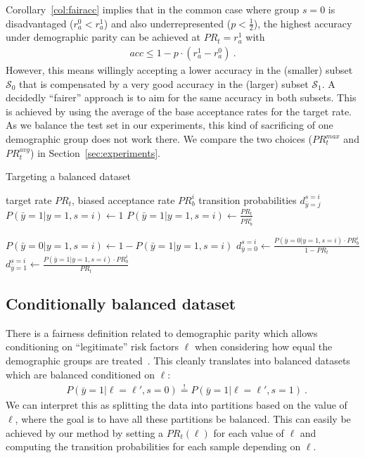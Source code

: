 Corollary~\ref{col:fairacc} implies that
in the common case where group $s=0$ is disadvantaged ($r_a^0 < r_a^1$) and also underrepresented ($p<\tfrac{1}{2}$),
the highest accuracy under demographic parity can be achieved at $\mathit{PR}_t=r_a^1$ with
\begin{align}
  \mathit{acc} \leq 1 - p\cdot\left( r^1_a -r^0_a \right)~.
\end{align}
However, this means willingly accepting a lower accuracy in the (smaller) subset $\mathcal{S}_0$
that is compensated by a very good accuracy in the (larger) subset $\mathcal{S}_1$.
A decidedly ``fairer'' approach is to aim for the same accuracy in both subsets.
This is achieved by using the average of the base acceptance rates for the target rate.
As we balance the test set in our experiments, this kind of sacrificing of one demographic group does not work there.
We compare the two choices ($\mathit{PR}_t^{max}$ and $\mathit{PR}_t^{avg}$) in Section~\ref{sec:experiments}.

\begin{algorithm}[t]
  \caption{Targeting a balanced dataset}%
  \label{alg:parity}
  \begin{algorithmic}[1]
    \REQUIRE target rate $\mathit{PR}_t$,  biased acceptance rate $\mathit{PR}_b^i$
    \ENSURE transition probabilities $d^{s=i}_{\bar{y}=j}$
    \STATE $P(\bar{y}=1|y=1,s=i) \gets 1$
    \ELSE
    \STATE $P(\bar{y}=1|y=1,s=i) \gets \frac{\mathit{PR}_t}{\mathit{PR}_b^i}$
    \ENDIF

    \STATE $P(\bar{y}=0|y=1,s=i) \gets 1 - P(\bar{y}=1|y=1,s=i)$
    \STATE $d^{s=i}_{\bar{y}=0} \gets \frac{P(\bar{y}=0|y=1,s=i)\cdot \mathit{PR}_b^i}{1 - \mathit{PR}_t}$
    \STATE $d^{s=i}_{\bar{y}=1} \gets \frac{P(\bar{y}=1|y=1,s=i)\cdot \mathit{PR}_b^i}{\mathit{PR}_t}$
    \ENDIF
  \end{algorithmic}
\end{algorithm}

\subsection{Conditionally balanced dataset}
\noindent There is a fairness definition related to demographic parity which allows conditioning on ``legitimate'' risk factors $\ell$
when considering how equal the demographic groups are treated~\cite{corbett2017algorithmic}.
This cleanly translates into balanced datasets which are balanced conditioned on $\ell$:
\begin{align}
  &P(\bar{y}=1|\ell=\ell\prime, s=0) \overset{!}{=} P(\bar{y}=1|\ell=\ell\prime, s=1)~.
\end{align}
We can interpret this as splitting the data into partitions based on the value of $\ell$,
where the goal is to have all these partitions be balanced.
This can easily be achieved by our method by setting a $\mathit{PR}_t(\ell)$ for each value of $\ell$
and computing the transition probabilities for each sample depending on $\ell$.

